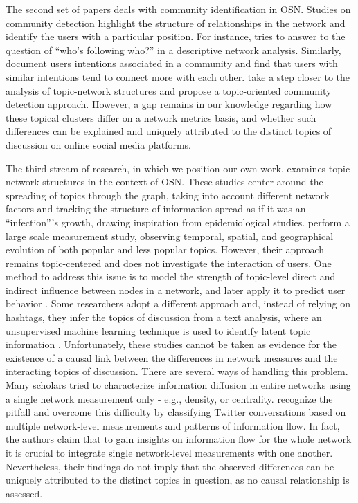 The second set of papers deals with community identification in OSN. Studies on community detection highlight the structure of relationships in the network and identify the users with a particular position. For instance, \citet{grandjean:2016} tries to answer to the question of ``who's following who?'' in a descriptive network analysis. Similarly, \citet{java:2007} document users intentions associated in a community and find that users with similar intentions tend to connect more with each other. \citet{zhao:2012} take a step closer to the analysis of topic-network structures and propose a topic-oriented community detection approach. However, a gap remains in our knowledge regarding how these topical clusters differ on a network metrics basis, and whether such differences can be explained and uniquely attributed to the distinct topics of discussion on online social media platforms.

The third stream of research, in which we position our own work, examines topic-network structures in the context of OSN. These studies center around the spreading of topics through the graph, taking into account different network factors and tracking the structure of information spread as if it was an ``infection'''s growth, drawing inspiration from epidemiological studies.
\citet{ardon:2013} perform a large scale measurement study, observing temporal, spatial, and geographical evolution of both popular and less popular topics. However, their approach remains topic-centered and does not investigate the interaction of users. %
One method to address this issue is to model the strength of topic-level direct and indirect influence between nodes in a network, and later apply it to predict user behavior \citep{liu:2010, tang:2009, lim:2016}.
Some researchers adopt a different approach and, instead of relying on hashtags, they infer the topics of discussion from a text analysis, where an unsupervised machine learning technique is used to identify latent topic information \citep{hong:2010, lhuillier:2011}. Unfortunately, these studies cannot be taken as evidence for the existence of a causal link between the differences in network measures and the interacting topics of discussion.
There are several ways of handling this problem. Many scholars tried to characterize information diffusion in entire networks using a single network measurement only - e.g., density, or centrality.
\citet{himelboim:2017} recognize the pitfall and overcome this difficulty by classifying Twitter conversations based on multiple network-level measurements and patterns of information flow. In fact, the authors claim that to gain insights on information flow for the whole network it is crucial to integrate single network-level measurements with one another. Nevertheless, their findings do not imply that the observed differences can be uniquely attributed to the distinct topics in question, as no causal relationship is assessed.

